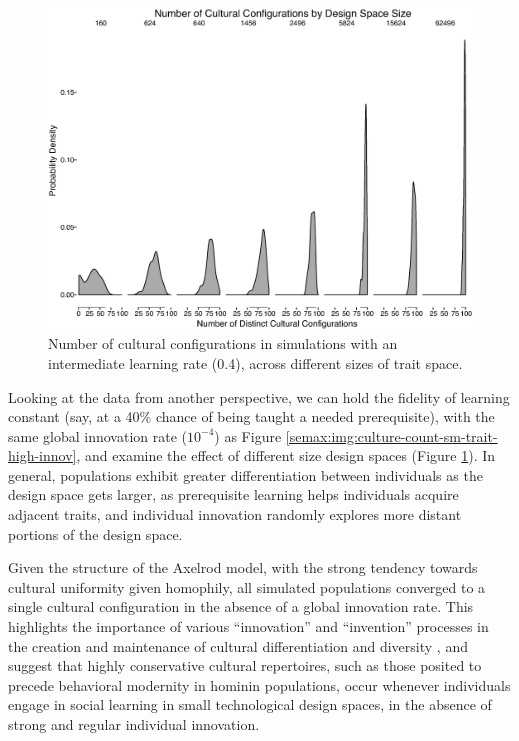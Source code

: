 \begin{figure}[htbp] 
    \centering
    \includegraphics[scale=0.4]{graphics/semanticaxelrod/culture-count-lr04-by-traitspace-size.eps}
    \caption{Number of cultural configurations in simulations with an intermediate learning rate (0.4), across different sizes of trait space.}
    \label{semax:img:culture-count-lr04-by-traitspace-size}
\end{figure}

Looking at the data from another perspective, we can hold the fidelity
of learning constant (say, at a 40\% chance of being taught a needed
prerequisite), with the same global innovation rate ($10^{-4}$) as
Figure \ref{semax:img:culture-count-sm-trait-high-innov}, and examine the
effect of different size design spaces (Figure
\ref{semax:img:culture-count-lr04-by-traitspace-size}). In general,
populations exhibit greater differentiation between individuals as the
design space gets larger, as prerequisite learning helps individuals
acquire adjacent traits, and individual innovation randomly explores
more distant portions of the design space.

Given the structure of the Axelrod model, with the strong tendency
towards cultural uniformity given homophily, all simulated populations
converged to a single cultural configuration in the absence of a global
innovation rate. This highlights the importance of various
``innovation'' and ``invention'' processes in the creation and
maintenance of cultural differentiation and diversity
\citep{eerkens2005cultural, o2010innovation}, and suggest that highly
conservative cultural repertoires, such as those posited to precede
behavioral modernity in hominin populations, occur whenever individuals
engage in social learning in small technological design spaces, in the
absence of strong and regular individual innovation.


